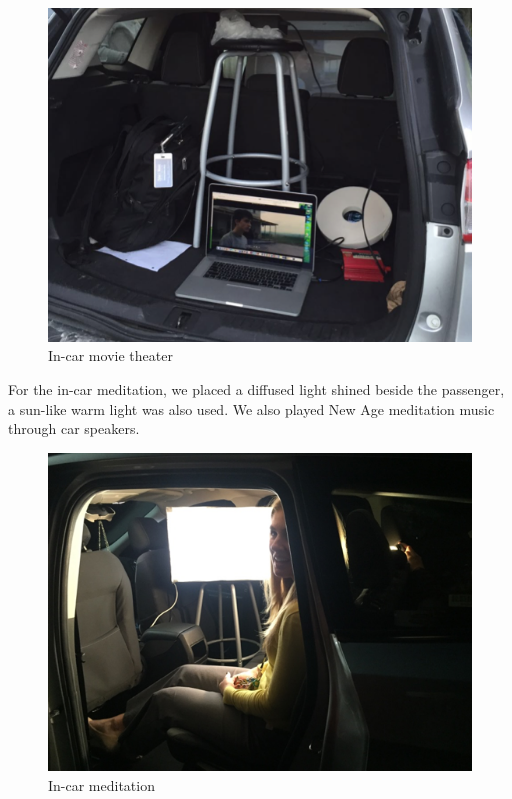 \begin{figure}
\centering
\includegraphics[width=5in]{Figures/Prototypes/DarkHorse/DarkHorseTheater2.png}
	\caption{In-car movie theater}
		\label{fig:DarkHorseTheater2}
\end{figure}

For the in-car meditation, we placed a diffused light shined beside the passenger, a sun-like warm light was also used. We also played New Age meditation music through car speakers.

\begin{figure}
\centering
\includegraphics[width=5in]{Figures/Prototypes/DarkHorse/DarkHorseMeditation1.png}
	\caption{In-car meditation}
		\label{fig:DarkHorseMeditation1}
\end{figure}

